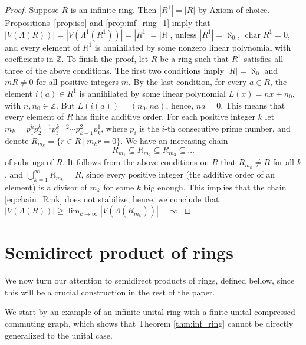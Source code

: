 \documentclass[12pt,a4paper]{amsart}
\theoremstyle{definition}
\newcommand{\Z}{\mathbb{Z}}
\DeclareMathOperator{\ch}{char}
\begin{document}
\begin{proof}
    Suppose $R$ is an infinite ring. Then $|R^1|=|R|$ by Axiom of choice.
    Propositions~\ref{prop:iso} and \ref{prop:inf_ring_1} imply that $|V(\Lambda(R))|=|V(\Lambda^1(R^1))|=|R^1|=|R|$, unless $|R^1|=\aleph_0$, $\ch R^1 = 0$, and every element of $R^1$ is annihilated by some nonzero linear polynomial with coefficients in $\Z$.
    To finish the proof, let $R$ be a ring such that $R^1$ satisfies all three of the above conditions.
    The first two conditions imply $|R|=\aleph_0$ and $mR \neq 0$ for all positive integers $m$.
    By the last condition, for every $a \in R$, the element $i(a) \in R^1$ is annihilated by some linear polynomial $L(x)=nx+n_0$, with $n,n_0 \in \Z$.
    But $L(i(a))=(n_0,na)$, hence, $na=0$.
    This means that every element of $R$ has finite additive order.
    For each positive integer $k$ let $m_k=p_1^{k}p_2^{k-1}p_3^{k-2}\cdots p_{k-1}^{2}p_k^{1}$, where $p_i$ is the $i$-th consecutive prime number, and denote $R_{m_k}=\{r \in R ~|~ m_kr=0\}$.
    We have an increasing chain
    \begin{equation}\label{eq:chain_Rmk}
    R_{m_1} \subseteq R_{m_2} \subseteq R_{m_3} \subseteq \ldots
    \end{equation}
    of subrings of $R$.
    It follows from the above conditions on $R$ that $R_{m_k} \neq R$ for all $k$, and $\bigcup_{k=1}^\infty R_{m_k} =R$, since every positive integer (the additive order of an element) is a divisor of $m_k$ for some $k$ big enough.
    This implies that the chain \eqref{eq:chain_Rmk} does not stabilize, hence, we conclude that $|V(\Lambda(R))| \geq\lim_{k \to \infty} |V(\Lambda(R_{m_k}))|=\infty$.
\end{proof}

\section{Semidirect product of rings}\label{sec:semidirect}

We now turn our attention to semidirect products of rings, defined bellow, since this will be a crucial construction in the rest of the paper. 

We start by an example of an infinite unital ring with a finite unital compressed commuting graph, which shows that Theorem \ref{thm:inf_ring} cannot be directly generalized to the unital case.
\end{document}
